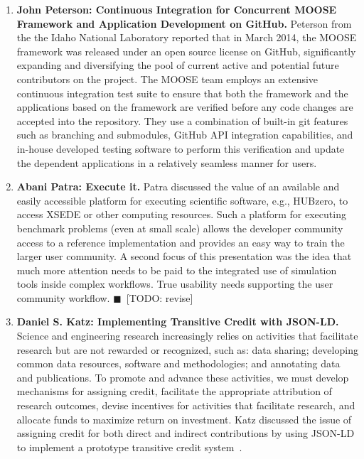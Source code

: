 \documentclass[11pt, oneside]{amsart}
\newcommand{\todo}[1]{{\color{blue}$\blacksquare$~\textsf{[TODO: #1]}}}
\begin{document}
\begin{enumerate}
\item \textbf{John Peterson: Continuous Integration for Concurrent MOOSE Framework and
Application Development on GitHub.} 
Peterson from the the Idaho National Laboratory reported that in March 2014, the
MOOSE framework was released under an open source license on GitHub,
significantly expanding and diversifying the pool of current active and
potential future contributors on the project. The MOOSE team employs an
extensive continuous integration test suite to ensure that both the framework
and the applications based on the framework are verified before any code changes
are accepted into the repository. They use a combination of built-in git
features such as branching and submodules, GitHub API integration capabilities,
and in-house developed testing software to perform this verification and update
the dependent applications in a relatively seamless manner for users.

\item \textbf{Abani Patra: Execute it.}
Patra discussed the value of
an available and easily accessible platform for executing scientific software,
e.g., HUBzero, to access XSEDE or other computing resources.
Such a platform for executing benchmark problems (even at small
scale) allows the developer community access to a reference implementation and
provides an easy way to train the larger user community. A second focus of this
presentation was the idea that much more attention needs to be paid to the
integrated use of simulation tools inside complex workflows. True usability
needs supporting the user community workflow. \todo{revise}


\item \textbf{Daniel S. Katz: Implementing Transitive Credit with JSON-LD.}
Science and engineering research increasingly relies on activities that
facilitate research but are not rewarded or recognized, such as: data
sharing; developing common data resources, software and methodologies; and
annotating data and publications. To promote and advance these activities, we
must develop mechanisms for assigning credit, facilitate the appropriate
attribution of research outcomes, devise incentives for activities that
facilitate research, and allocate funds to maximize return on investment. Katz
discussed the issue of assigning credit for both direct and indirect
contributions by using JSON-LD to implement a prototype transitive credit
system~\cite{Katz_transitive_credit_poster}.



\end{enumerate}
\end{document}
